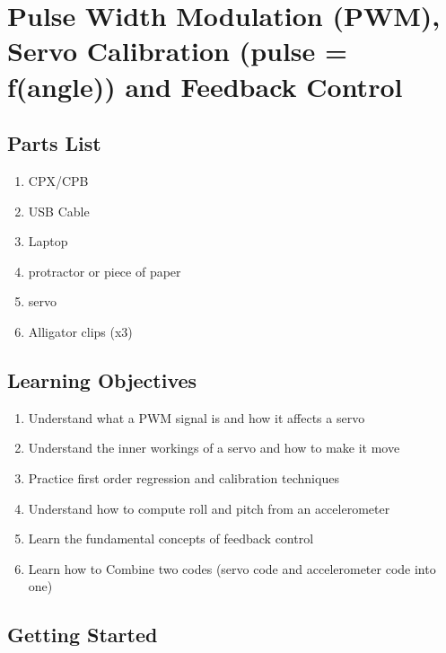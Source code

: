 \newpage

\section{Pulse Width Modulation (PWM), Servo Calibration (pulse =
  f(angle)) and Feedback Control}
\label{s:pwm}

\subsection{Parts List}

\begin{enumerate}[itemsep=-5pt]
\item CPX/CPB
\item USB Cable
\item Laptop
\item protractor or piece of paper
\item servo
\item Alligator clips (x3)
\end{enumerate}

\subsection{Learning Objectives}
\begin{enumerate}[itemsep=-5pt]
\item Understand what a PWM signal is and how it affects a servo
\item Understand the inner workings of a servo and how to make it move
\item Practice first order regression and calibration techniques
\item Understand how to compute roll and pitch from an accelerometer
\item Learn the fundamental concepts of feedback control
\item Learn how to Combine two codes (servo code and accelerometer code into one)
\end{enumerate}

\subsection{Getting Started}

